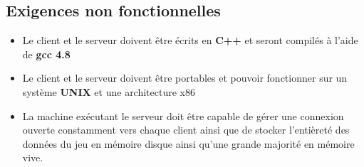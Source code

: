 \documentclass[a4paper]{article}
\begin{document}
\subsection{Exigences non fonctionnelles}
\label{enf}
\begin{itemize}
\item Le \gls{client} et le \gls{serveur} doivent être écrits en \textbf{C++} et seront compilés à l'aide de \textbf{gcc 4.8}
\item Le \gls{client} et le \gls{serveur} doivent être portables et pouvoir fonctionner sur un système \textbf{UNIX} et une architecture x86
\item La machine exécutant le \gls{serveur} doit être capable de gérer une connexion ouverte constamment vers chaque \gls{client} ainsi que de stocker l'entièreté des données du jeu en mémoire disque ainsi qu'une grande majorité en mémoire vive.
\end{itemize}
\end{document}
